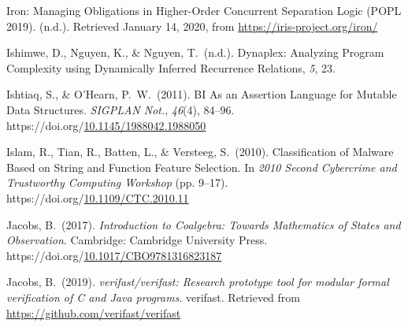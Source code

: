 \documentclass[12pt,twoside]{article}
\begin{document}
{\begin{thebibliography}{1079}
\mdbibitemlabel{}Iron: Managing Obligations in Higher-Order Concurrent Separation Logic (POPL 2019). (n.d.). Retrieved January 14, 2020, from \href{https://iris-project.org/iron/}{{\ttfamily https://\hspace{0pt}iris-\hspace{0pt}project.\hspace{0pt}org/\hspace{0pt}iron/\hspace{0pt}}}%

\mdbibitemlabel{}Ishimwe, D., Nguyen, K., \& Nguyen, T.~(n.d.). Dynaplex: Analyzing Program Complexity using Dynamically Inferred Recurrence Relations, \emph{5}, 23.%

\mdbibitemlabel{}Ishtiaq, S., \& O’Hearn, P.~W.~(2011). BI As an Assertion Language for Mutable Data Structures. \emph{SIGPLAN Not.}, \emph{46}(4), 84–96. https://doi.org/\href{https://dx.doi.org/10.1145/1988042.1988050}{10.1145/1988042.1988050}%

\mdbibitemlabel{}Islam, R., Tian, R., Batten, L., \& Versteeg, S.~(2010). Classification of Malware Based on String and Function Feature Selection. In \emph{2010 Second Cybercrime and Trustworthy Computing Workshop} (pp. 9–17). https://doi.org/\href{https://dx.doi.org/10.1109/CTC.2010.11}{10.1109/CTC.2010.11}%

\mdbibitemlabel{}Jacobs, B.~(2017). \emph{Introduction to Coalgebra: Towards Mathematics of States and Observation}. Cambridge: Cambridge University Press. https://doi.org/\href{https://dx.doi.org/10.1017/CBO9781316823187}{10.1017/CBO9781316823187}%

\mdbibitemlabel{}Jacobs, B.~(2019). \emph{verifast/verifast: Research prototype tool for modular formal verification of C and Java programs}. verifast. Retrieved from \href{https://github.com/verifast/verifast}{{\ttfamily https://\hspace{0pt}github.\hspace{0pt}com/\hspace{0pt}verifast/\hspace{0pt}verifast}}%


\end{thebibliography}}
\end{document}
